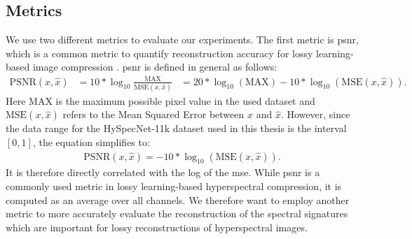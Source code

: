 \subsection{Metrics}
We use two different metrics to evaluate our experiments. The first metric is \ac{psnr}, which is a common metric to quantify reconstruction accuracy for lossy learning-based image compression \citep{balle_end--end_2017,balle_variational_2018,minnen_joint_2018,kuester_1d-convolutional_2021,kuester_transferability_2022,la_grassa_hyperspectral_2022}. \Ac{psnr}  is defined in general as follows:
\begin{align}
\text{PSNR}(x,\hat{x}) &= 10*\log_{10}\frac{\text{MAX}}{\text{MSE}(x,\hat{x})}
&= 20 * \log_{10}(\text{MAX}) - 10*\log_{10}(\text{MSE}(x,\hat{x})).
\end{align}
Here MAX is the maximum possible pixel value in the used dataset and $\text{MSE}(x,\hat{x})$ refers to the Mean Squared Error between $x$ and $\hat{x}$. However, since the data range for the HySpecNet-11k dataset used in this thesis is the interval $[0,1]$, the equation simplifies to:
\begin{align}
\text{PSNR}(x,\hat{x}) = - 10*\log_{10}(\text{MSE}(x,\hat{x})).
\end{align}
It is therefore directly correlated with the log of the \ac{mse}.
While \ac{psnr} is a commonly used metric in lossy learning-based hyperspectral compression, it is computed as an average over all channels. We therefore want to employ another metric to more accurately evaluate the reconstruction of the spectral signatures which are important for lossy reconstructions of hyperspectral images.

